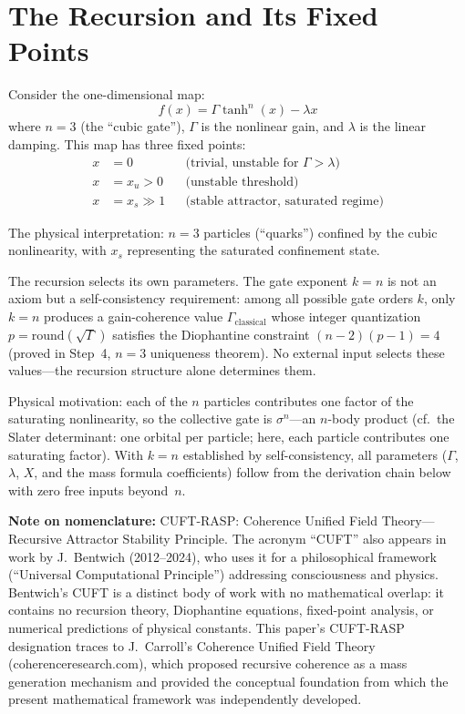\documentclass[12pt,a4paper]{article}
\theoremstyle{definition}
\begin{document}
\section{The Recursion and Its Fixed Points}

Consider the one-dimensional map:
\begin{equation}\label{eq:recursion}
  f(x) = \Gamma \tanh^n(x) - \lambda x
\end{equation}
where $n = 3$ (the ``cubic gate''), $\Gamma$ is the nonlinear gain, and
$\lambda$ is the linear damping. This map has three fixed points:
\begin{align*}
  x &= 0           &&\text{(trivial, unstable for $\Gamma > \lambda$)} \\
  x &= x_u > 0     &&\text{(unstable threshold)} \\
  x &= x_s \gg 1   &&\text{(stable attractor, saturated regime)}
\end{align*}

The physical interpretation: $n = 3$ particles (``quarks'') confined by the
cubic nonlinearity, with $x_s$ representing the saturated confinement state.

The recursion selects its own parameters. The gate exponent $k = n$ is not
an axiom but a self-consistency requirement: among all possible gate orders
$k$, only $k = n$ produces a gain-coherence value $\Gamma_\mathrm{classical}$
whose integer quantization $p = \mathrm{round}(\sqrt{\Gamma})$ satisfies the
Diophantine constraint $(n-2)(p-1) = 4$ (proved in Step~4, $n = 3$
uniqueness theorem). No external input selects these values---the recursion
structure alone determines them.

Physical motivation: each of the $n$ particles contributes one factor of the
saturating nonlinearity, so the collective gate is $\sigma^n$---an $n$-body
product (cf.\ the Slater determinant: one orbital per particle; here, each
particle contributes one saturating factor). With $k = n$ established by
self-consistency, all parameters ($\Gamma$, $\lambda$, $X$, and the mass
formula coefficients) follow from the derivation chain below with zero free
inputs beyond~$n$.

\smallskip\noindent
\textbf{Note on nomenclature:}
CUFT-RASP: Coherence Unified Field Theory---Recursive Attractor Stability
Principle. The acronym ``CUFT'' also appears in work by J.~Bentwich
(2012--2024), who uses it for a philosophical framework (``Universal
Computational Principle'') addressing consciousness and physics. Bentwich's
CUFT is a distinct body of work with no mathematical overlap: it contains
no recursion theory, Diophantine equations, fixed-point analysis, or
numerical predictions of physical constants. This paper's CUFT-RASP
designation traces to J.~Carroll's Coherence Unified Field Theory
(coherenceresearch.com), which proposed recursive coherence as a mass
generation mechanism and provided the conceptual foundation from which the
present mathematical framework was independently developed.
\end{document}
